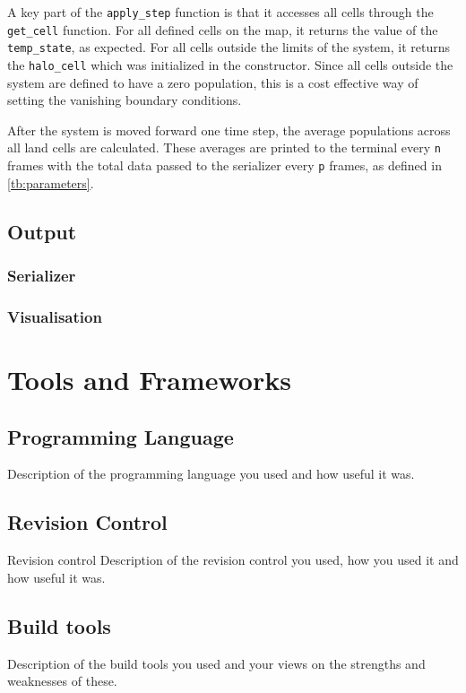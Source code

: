 \documentclass[a4paper,11pt]{article}
\begin{document}
A key part of the \texttt{apply\_step} function is that it accesses all cells through the \texttt{get\_cell} function.  For all defined cells on the map, it returns the value of the \texttt{temp\_state}, as expected.  For all cells outside the limits of the system, it returns the \texttt{halo\_cell} which was initialized in the constructor.  Since all cells outside the system are defined to have a zero population, this is a cost effective way of setting the vanishing boundary conditions.

After the system is moved forward one time step, the average populations across all land cells are calculated.  These averages are printed to the terminal every \texttt{n} frames with the total data passed to the serializer every \texttt{p} frames, as defined in \ref{tb:parameters}.

\subsection{Output}\label{output}

\subsubsection{Serializer}

\subsubsection{Visualisation}

\section{Tools and Frameworks}

\subsection{Programming Language}
Description of the programming language you used and how useful it was.

\subsection{Revision Control}
Revision control Description of the revision control you used, how you used it and how useful it was.

\subsection{Build tools}
Description of the build tools you used and your views on the strengths and weaknesses of these.
\end{document}
